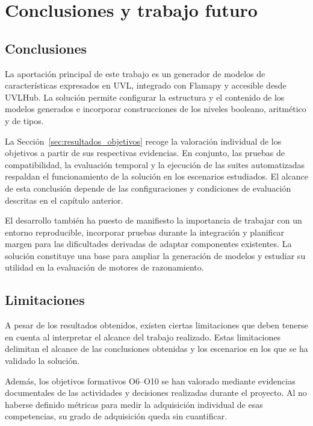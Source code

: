 \chapter{Conclusiones y trabajo futuro}
\label{chap:conclusiones}


\section{Conclusiones}
\label{sec:conclusiones}

La aportación principal de este trabajo es un generador de modelos de
características expresados en UVL, integrado con Flamapy y accesible desde
UVLHub. La solución permite configurar la estructura y el contenido de los
modelos generados e incorporar construcciones de los niveles booleano,
aritmético y de tipos.

La Sección~\ref{sec:resultados_objetivos} recoge la valoración individual de
los objetivos a partir de sus respectivas evidencias. En conjunto, las pruebas
de compatibilidad, la evaluación temporal y la ejecución de las suites
automatizadas respaldan el funcionamiento de la solución en los escenarios
estudiados. El alcance de esta conclusión depende de las configuraciones y
condiciones de evaluación descritas en el capítulo anterior.

El desarrollo también ha puesto de manifiesto la importancia de trabajar con
un entorno reproducible, incorporar pruebas durante la integración y planificar
margen para las dificultades derivadas de adaptar componentes existentes. La
solución constituye una base para ampliar la generación de modelos y estudiar
su utilidad en la evaluación de motores de razonamiento.

\section{Limitaciones}
\label{sec:limitaciones}


A pesar de los resultados obtenidos, existen ciertas limitaciones que deben
tenerse en cuenta al interpretar el alcance del trabajo realizado. Estas limitaciones 
delimitan el alcance de las conclusiones obtenidas y los
escenarios en los que se ha validado la solución.

Además, los objetivos formativos O6--O10 se han valorado mediante evidencias
documentales de las actividades y decisiones realizadas durante el proyecto.
Al no haberse definido métricas para medir la adquisición individual de esas
competencias, su grado de adquisición queda sin cuantificar.

